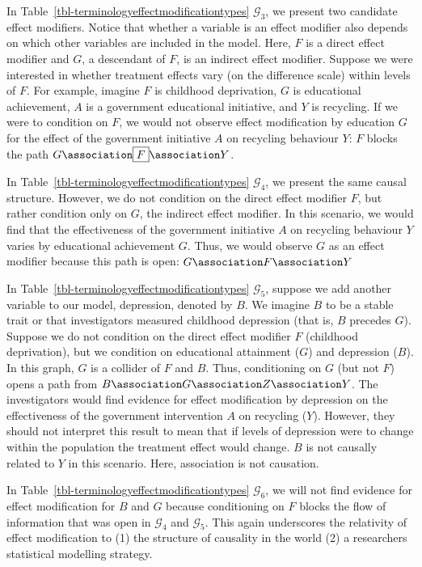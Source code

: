 \documentclass[
  single column]{article}
\begin{document}
In Table~\ref{tbl-terminologyeffectmodificationtypes} \(\mathcal{G}_3\),
we present two candidate effect modifiers. Notice that whether a
variable is an effect modifier also depends on which other variables are
included in the model. Here, \(F\) is a direct effect modifier and
\(G\), a descendant of \(F\), is an indirect effect modifier. Suppose we
were interested in whether treatment effects vary (on the difference
scale) within levels of \(F\). For example, imagine \(F\) is childhood
deprivation, \(G\) is educational achievement, \(A\) is a government
educational initiative, and \(Y\) is recycling. If we were to condition
on \(F\), we would not observe effect modification by education \(G\)
for the effect of the government initiative \(A\) on recycling behaviour
\(Y\): \(\boxed{F}\) blocks the path
\(G \association \boxed{F} \association Y\).

In Table~\ref{tbl-terminologyeffectmodificationtypes} \(\mathcal{G}_4\),
we present the same causal structure. However, we do not condition on
the direct effect modifier \(F\), but rather condition only on \(G\),
the indirect effect modifier. In this scenario, we would find that the
effectiveness of the government initiative \(A\) on recycling behaviour
\(Y\) varies by educational achievement \(G\). Thus, we would observe
\(G\) as an effect modifier because this path is open:
\(G \association F \association Y\)

In Table~\ref{tbl-terminologyeffectmodificationtypes} \(\mathcal{G}_5\),
suppose we add another variable to our model, depression, denoted by
\(B\). We imagine \(B\) to be a stable trait or that investigators
measured childhood depression (that is, \(B\) precedes \(G\)). Suppose
we do not condition on the direct effect modifier \(F\) (childhood
deprivation), but we condition on educational attainment (\(G\)) and
depression (\(B\)). In this graph, \(G\) is a collider of \(F\) and
\(B\). Thus, conditioning on \(G\) (but not \(F\)) opens a path from
\(B \association G \association Z \association Y\). The investigators
would find evidence for effect modification by depression on the
effectiveness of the government intervention \(A\) on recycling (\(Y\)).
However, they should not interpret this result to mean that if levels of
depression were to change within the population the treatment effect
would change. \(B\) is not causally related to \(Y\) in this scenario.
Here, association is not causation.

In Table~\ref{tbl-terminologyeffectmodificationtypes} \(\mathcal{G}_6\),
we will not find evidence for effect modification for \(B\) and \(G\)
because conditioning on \(F\) blocks the flow of information that was
open in \(\mathcal{G}_4\) and \(\mathcal{G}_5\). This again underscores
the relativity of effect modification to (1) the structure of causality
in the world (2) a researchers statistical modelling strategy.
\end{document}
